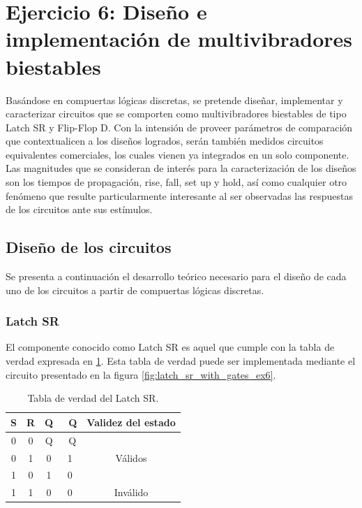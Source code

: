 \section{Ejercicio 6: Dise\~no e implementaci\'on de multivibradores biestables}
Basándose en compuertas lógicas discretas, se pretende diseñar, implementar y caracterizar circuitos que se comporten como multivibradores biestables de tipo Latch SR y 
Flip-Flop D.
Con la intensión de proveer parámetros de comparación que contextualicen a los diseños logrados, serán también medidos circuitos equivalentes comerciales, los cuales vienen 
ya integrados en un solo componente. \\
Las magnitudes que se consideran de interés para la caracterización de los diseños son los tiempos de propagación, rise, fall, set up y hold, así como cualquier otro 
fenómeno que resulte particularmente interesante al ser observadas las respuestas de los circuitos ante sus estímulos.



\subsection{Diseño de los circuitos}
Se presenta a continuación el desarrollo teórico necesario para el diseño de cada uno de los circuitos a partir de compuertas lógicas discretas.


\subsubsection{Latch SR}
El componente conocido como Latch SR es aquel que cumple con la tabla de verdad expresada en \ref{table:latch_sr_truth_table_ex6}.
Esta tabla de verdad puede ser implementada mediante el circuito presentado en la figura \ref{fig:latch_sr_with_gates_ex6}.

\begin{table}[H]
    \centering
    \begin{tabular}{cc|cc|c}
    \textbf{S} & \textbf{R} & \textbf{Q} & \textbf{~Q} & \textbf{Validez del estado} \\ \hline
    0          & 0          & Q          & ~Q          & \multirow{3}{*}{Válidos}    \\
    0          & 1          & 0          & 1           &                             \\
    1          & 0          & 1          & 0           &                             \\ \cline{5-5} 
    1          & 1          & 0          & 0           & Inválido                   
    \end{tabular}
    \caption{Tabla de verdad del Latch SR.}
    \label{table:latch_sr_truth_table_ex6}
\end{table}

